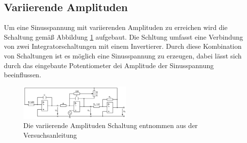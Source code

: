     \subsection{Variierende Amplituden}
        Um eine Sinusspannung mit variierenden Amplituden zu erreichen wird die Schaltung gemäß Abbildung \ref{fig:variierende_Amp} aufgebaut.
        Die Schltung umfasst eine Verbindung von zwei Integratorschaltungen mit einem Invertierer.
        Durch diese Kombination von Schaltungen ist es möglich eine Sinusspannung zu erzeugen, dabei lässt sich durch das eingebaute Potentiometer dei Amplitude der Sinusspannung beeinflussen.
        \begin{figure}[ht]
            \centering
            \includegraphics[width = 0.5\textwidth]{bilder/variierende_Amp.png}
            \caption{Die variierende Amplituden Schaltung entnommen aus der Versuchsanleitung}
            \label{fig:variierende_Amp}
        \end{figure}